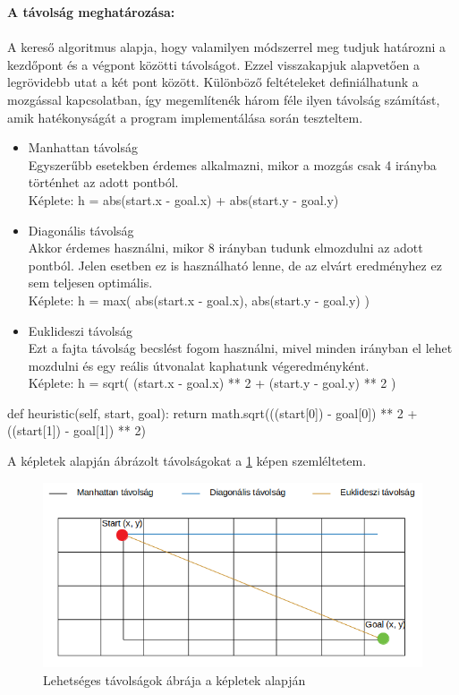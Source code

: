 \textbf{A távolság meghatározása:}\\\\
A kereső algoritmus alapja, hogy valamilyen módszerrel meg tudjuk határozni a kezdőpont és a végpont közötti távolságot. Ezzel visszakapjuk alapvetően a legrövidebb utat a két pont között. Különböző feltételeket definiálhatunk a mozgással kapcsolatban, így megemlítenék három féle ilyen távolság számítást, amik hatékonyságát a program implementálása során teszteltem.
\begin{itemize}
	\item Manhattan távolság\\
	Egyszerűbb esetekben érdemes alkalmazni, mikor a mozgás csak 4 irányba történhet az adott pontból. \\
	Képlete: h = abs(start.x - goal.x) + abs(start.y - goal.y)
	\item Diagonális távolság\\
	Akkor érdemes használni, mikor 8 irányban tudunk elmozdulni az adott pontból. Jelen esetben ez is használható lenne, de az elvárt eredményhez ez sem teljesen optimális.\\
	Képlete: h = max( abs(start.x - goal.x), abs(start.y - goal.y) )
	\item Euklideszi távolság\\
	Ezt a fajta távolság becslést fogom használni, mivel minden irányban el lehet mozdulni és egy reális útvonalat kaphatunk végeredményként.\\
	Képlete: h = sqrt( (start.x - goal.x) ** 2 + (start.y - goal.y) ** 2 )
\end{itemize}

\begin{python}
    def heuristic(self, start, goal):
        return math.sqrt(((start[0]) - goal[0]) ** 2 +
                         ((start[1]) - goal[1]) ** 2)
\end{python}

A képletek alapján ábrázolt távolságokat a  \ref{fig:distances} képen szemléltetem.

\begin{figure}[h!]
\centering
\includegraphics[scale=0.65]{images/distances.png}
\caption{Lehetséges távolságok ábrája a képletek alapján}
\label{fig:distances}
\end{figure}

